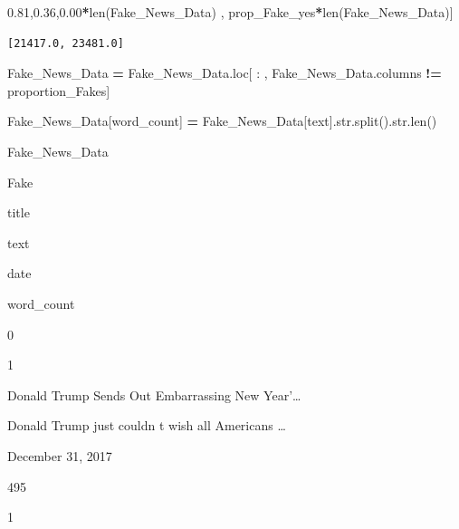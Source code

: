 \documentclass[
  11pt,
  a4paper,
]{article}
\newenvironment{Shaded}{\begin{snugshade}}{\end{snugshade}}
\newcommand{\BuiltInTok}[1]{#1}
\newcommand{\NormalTok}[1]{#1}
\newcommand{\OperatorTok}[1]{\textcolor[rgb]{0.81,0.36,0.00}{\textbf{#1}}}
\newcommand{\StringTok}[1]{\textcolor[rgb]{0.31,0.60,0.02}{#1}}
\begin{document}
\begin{Shaded}
\begin{Highlighting}[]
\NormalTok{[prop\_Fake\_no}\OperatorTok{*}\BuiltInTok{len}\NormalTok{(Fake\_News\_Data) , prop\_Fake\_yes}\OperatorTok{*}\BuiltInTok{len}\NormalTok{(Fake\_News\_Data)]}
\end{Highlighting}
\end{Shaded}

\begin{verbatim}
[21417.0, 23481.0]
\end{verbatim}

\begin{Shaded}
\begin{Highlighting}[]
\NormalTok{Fake\_News\_Data }\OperatorTok{=}\NormalTok{ Fake\_News\_Data.loc[ : , Fake\_News\_Data.columns }\OperatorTok{!=} \StringTok{\textquotesingle{}proportion\_Fakes\textquotesingle{}}\NormalTok{]}
\end{Highlighting}
\end{Shaded}

\begin{Shaded}
\begin{Highlighting}[]
\NormalTok{Fake\_News\_Data[}\StringTok{\textquotesingle{}word\_count\textquotesingle{}}\NormalTok{] }\OperatorTok{=}\NormalTok{ Fake\_News\_Data[}\StringTok{\textquotesingle{}text\textquotesingle{}}\NormalTok{].}\BuiltInTok{str}\NormalTok{.split().}\BuiltInTok{str}\NormalTok{.}\BuiltInTok{len}\NormalTok{()}
\end{Highlighting}
\end{Shaded}

\begin{Shaded}
\begin{Highlighting}[]
\NormalTok{Fake\_News\_Data}
\end{Highlighting}
\end{Shaded}

Fake

title

text

date

word\_count

0

1

Donald Trump Sends Out Embarrassing New Year'\ldots{}

Donald Trump just couldn t wish all Americans \ldots{}

December 31, 2017

495

1
\end{document}
